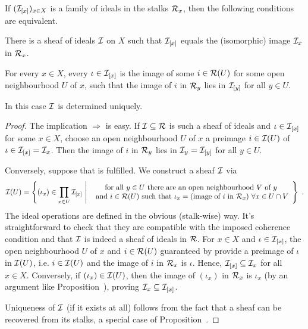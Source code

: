 \documentclass[a4paper,parskip=half,numbers=enddot, DIV=12]{scrreprt}
\begin{document}
\begin{prop}
    If $(\mathcal{I}_{[x]})_{x\in X}$ is a family of ideals in the stalks $\mathcal{R}_x$, then the following conditions are equivalent.
    \begin{alphanumerate}
        \item 
            There is a sheaf of ideals $\mathcal{I}$ on $X$ such that $\mathcal{I}_{[x]}$ equals the (isomorphic) image $\mathcal{I}_x$ in $\mathcal{R}_x$.
        \item  
            For every $x\in X$, every $\iota\in \mathcal{I}_{[x]}$ is the image of some $i\in\mathcal{R}(U)$ for some open neighbourhood $U$ of $x$, such that the image of $i$ in $\mathcal{R}_y$ lies in $\mathcal{I}_{[y]}$ for all $y\in U$.
    \end{alphanumerate}
    In this case $\mathcal{I}$ is determined uniquely.
\end{prop}
	\begin{proof}
		The implication  $\Rightarrow$  is easy. If $\mathcal{I}\subseteq\mathcal{R}$ is such a sheaf of ideals and $\iota\in\mathcal{I}_{[x]}$ for some $x\in X$, choose an open neighbourhood $U$ of $x$ a preimage $i\in\mathcal{I}(U)$ of $\iota\in\mathcal{I}_{[x]}=\mathcal{I}_x$. Then the image of $i$ in $\mathcal{R}_y$ lies in $\mathcal{I}_y=\mathcal{I}_{[y]}$ for all $y\in U$.
		
		Conversely, suppose that  is fulfilled. We construct a sheaf $\mathcal{I}$ via
		\begin{align*}
			\mathcal{I}(U)=\left\{(\iota_x)\in\prod_{x\in U}\mathcal{I}_{[x]}\ \middle|\ 
			\begin{array}{c}
			\text{for all }y\in U\text{ there are an open neighbourhood }V\text{ of }y\\
			\text{ and }i\in\mathcal{R}(U)\text{ such that }\iota_x=(\text{image of }i\text{ in }\mathcal{R}_x)\ \forall x\in U\cap V
			\end{array}\right\}\;.
		\end{align*}
		The ideal operations are defined in the obvious (stalk-wise) way. It's straightforward to check that they are compatible with the imposed coherence condition and that $\mathcal{I}$ is indeed a sheaf of ideals in $\mathcal{R}$. For $x\in X$ and $\iota\in\mathcal{I}_{[x]}$, the open neighbourhood $U$ of $x$ and $i\in\mathcal{R}(U)$ guaranteed by  provide a preimage of $\iota$ in $\mathcal{I}(U)$, i.e. $i\in\mathcal{I}(U)$ and the image of $i$ in $\mathcal{R}_x$ is $\iota$. Hence, $\mathcal{I}_{[x]}\subseteq\mathcal{I}_x$ for all $x\in X$. Conversely, if $(\iota_x)\in\mathcal{I}(U)$, then the image of $(\iota_x)$ in $\mathcal{R}_x$ is $\iota_x$ (by an argument like Proposition~), proving $\mathcal{I}_x\subseteq\mathcal{I}_{[x]}$.
		
		Uniqueness of $\mathcal{I}$ (if it exists at all) follows from the fact that a sheaf can be recovered from its stalks, a special case of Proposition~.
	\end{proof}
\end{document}
